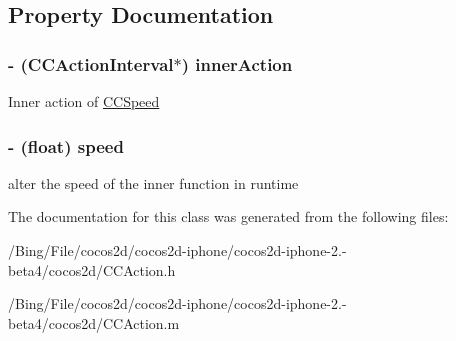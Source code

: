 \subsection{Property Documentation}
\hypertarget{interface_c_c_speed_a79868e5ba88157593769820e5a3a610d}{
\subsubsection[{inner\-Action}]{\setlength{\rightskip}{0pt plus 5cm}-\/ ({\bf C\-C\-Action\-Interval}$\ast$) {\bf inner\-Action}}}\label{interface_c_c_speed_a79868e5ba88157593769820e5a3a610d}
Inner action of \hyperlink{interface_c_c_speed}{C\-C\-Speed} \hypertarget{interface_c_c_speed_a346e8637e932398e07aba868ef7b11d6}{
\subsubsection[{speed}]{\setlength{\rightskip}{0pt plus 5cm}-\/ (float) {\bf speed}}}\label{interface_c_c_speed_a346e8637e932398e07aba868ef7b11d6}
alter the speed of the inner function in runtime 

The documentation for this class was generated from the following files\-:\begin{DoxyCompactItemize}
\item 
/\-Bing/\-File/cocos2d/cocos2d-\/iphone/cocos2d-\/iphone-\/2.-\/beta4/cocos2d/C\-C\-Action.\-h\item 
/\-Bing/\-File/cocos2d/cocos2d-\/iphone/cocos2d-\/iphone-\/2.-\/beta4/cocos2d/C\-C\-Action.\-m\end{DoxyCompactItemize}
